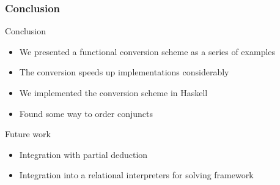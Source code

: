 \documentclass[xcolor=table]{beamer}
\newcommand{\sem}[1]{\llbracket #1 \rrbracket}
\begin{document}
\begin{frame}[fragile]
  \frametitle{Conclusion}
Conclusion
  \begin{itemize}
    \item We presented a functional conversion scheme as a series of examples
    \item The conversion speeds up implementations considerably
    \item We implemented the conversion scheme in Haskell
    \item Found some way to order conjuncts
  \end{itemize}

\vfill

Future work
  \begin{itemize}
    \item Integration with partial deduction
    \item Integration into a relational interpreters for solving framework
  \end{itemize}
\end{frame}












\end{document}
